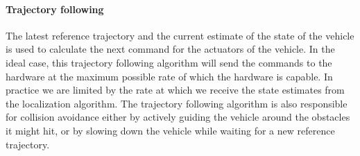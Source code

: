 \paragraph{Trajectory following} The latest reference trajectory and the current estimate of the state of the vehicle is used to calculate the next command for the actuators of the vehicle. In the ideal case, this trajectory following algorithm will send the commands to the hardware at the maximum possible rate of which the hardware is capable. In practice we are limited by the rate at which we receive the state estimates from the localization algorithm. The trajectory following algorithm is also responsible for collision avoidance either by actively guiding the vehicle around the obstacles it might hit, or by slowing down the vehicle while waiting for a new reference trajectory.


